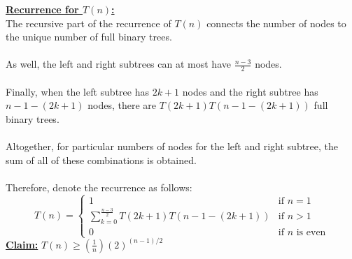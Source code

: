 \documentclass[12pt]{article}
\begin{document}
\textbf{\underline{Recurrence for $T(n)$:}} \\
The recursive part of the recurrence of $T(n)$ connects the number of nodes to the unique number of full binary trees. \\
\\
As well, the left and right subtrees can at most have $\frac{n - 3}{2}$ nodes. \\
\\
Finally, when the left subtree has $2k + 1$ nodes and the right subtree has $n - 1 - (2k + 1)$ nodes, there are $T(2k + 1)T(n - 1 - (2k + 1))$ full binary trees. \\
\\
Altogether, for particular numbers of nodes for the left and right subtree, the sum of all of these combinations is obtained. \\
\\
Therefore, denote the recurrence as follows:
\Large
\[
    T(n) =
    \begin{cases}
        1 & \text{if } n = 1 \\
        \sum_{k = 0}^{\frac{n - 3}{2}} T(2k + 1)T(n - 1 - (2k + 1)) & \text{if } n > 1 \\
        0 & \text{if } n \text{ is even}
    \end{cases}
\]
\normalsize
\large \textbf{\underline {Claim:}} \(T(n) \geq (\frac{1}{n})(2)^{(n - 1) / 2}\)
\normalsize
\end{document}

